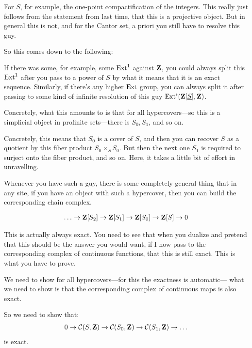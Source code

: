 For $S$, for example, the one-point compactification of the integers. This really just follows from the statement from last time, that this is a projective object. 
But in general this is not, and for the Cantor set, a priori you still have to resolve this guy. 

So this comes down to the following:

% 
If there was some, for example, some $\operatorname{Ext}^1$ against $\mathbf Z$, you could always split this $\operatorname{Ext}^1$ after you pass to a power of $S$  by what it means that it is an exact sequence. 
Similarly, if there's any higher $\operatorname{Ext}$ group, you can always split it after passing to some kind of infinite resolution of this guy $\operatorname{Ext}^i(\mathbf Z[\underline{S}],\mathbf Z)$. 


Concretely, what this amounts to is that for all hypercovers---so this is a simplicial object in profinite sets---there is $S_0, S_1$, and so on.

Concretely, this means that $S_0$ is a cover of $S$, and then you can recover $S$ as a quotient by this fiber product $S_0 \times_S S_0$. 
But then the next one $S_1$ is required to surject onto the fiber product, and so on. Here, it takes a little bit of effort in unravelling.


Whenever you have such a guy, there is some completely general thing that in any site, if you have an object with such a hypercover, then you can build the corresponding chain complex. 

\begin{align*}
	\ldots \to \mathbf Z[S_2] \to \mathbf Z[S_1] \to \mathbf Z[S_0] \to \mathbf Z[S] \to 0
\end{align*}

This is actually always exact.
You need to see that when you dualize and pretend that this should be the answer you would want, if I now pass to the corresponding complex of continuous functions, that this is still exact. 
This is what you have to prove.

We need to show for all hypercovers---for this the exactness is automatic--- what we need to show is that the corresponding complex of continuous maps is also exact. 

So we need to show that:
\begin{align*}
	0 \to \mathcal{C}(S,\mathbf Z) \to \mathcal{C}(S_0,\mathbf Z) \to \mathcal{C}(S_1,\mathbf Z) \to \ldots
\end{align*}
is exact.

